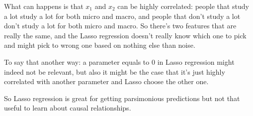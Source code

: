 \documentclass{article}
\theoremstyle{problemstyle}
\begin{document}
What can happens is that $x_1$ and $x_2$ can be highly correlated: people that study a lot study a lot for both micro and macro, and people that don't study a lot don't study a lot for both micro and macro. So there's two features that are really the same, and the Lasso regression doesn't really know which one to pick and might pick to wrong one based on nothing else than noise. 

To say that another way: a parameter equals to 0 in Lasso regression might indeed not be relevant, but also it might be the case that it's just highly correlated with another parameter and Lasso choose the other one. 

So Lasso regression is great for getting parsimonious predictions but not that useful to learn about causal relationships. 
\end{document}
